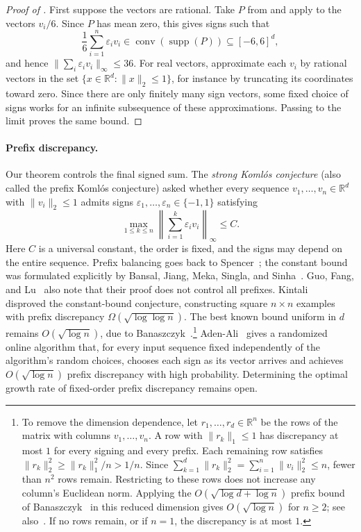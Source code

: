\documentclass{article}
\newcommand{\R}{\mathbb{R}}
\newcommand{\eps}{\varepsilon}
\newcommand{\supp}{\operatorname{supp}}
\newcommand{\norm}[1]{\left \| #1 \right \|}
\begin{document}
\begin{proof}[Proof of ]
First suppose the vectors are rational. Take $P$ from
 and apply  to the vectors
$v_i/6$. Since $P$ has mean zero, this gives signs such that
\[
\frac16\sum_{i=1}^n\eps_i v_i
\in\operatorname{conv}(\supp(P))\subseteq[-6,6]^d,
\]
and hence $\|\sum_i\eps_i v_i\|_\infty\le36$.
For real vectors, approximate each $v_i$ by rational vectors in the
set $\{x\in\R^d:\|x\|_2\le1\}$, for instance by truncating its coordinates
toward zero. Since there are only finitely many sign vectors, some
fixed choice of signs works for an infinite subsequence of these approximations.
Passing to the limit proves the same bound.
\end{proof}

\paragraph{Prefix discrepancy.}
Our theorem controls the final signed sum.
The \emph{strong Koml\'os conjecture} (also called the prefix
Koml\'os conjecture) asked whether every sequence
$v_1,\ldots,v_n\in\R^d$ with $\|v_i\|_2\le1$ admits signs
$\eps_1,\ldots,\eps_n\in\{-1,1\}$ satisfying
\[
\max_{1\le k\le n}
\norm{\sum_{i=1}^k\eps_i v_i}_{\infty}\le C.
\]
Here $C$ is a universal constant, the order is fixed, and the
signs may depend on the entire sequence.
Prefix balancing goes back to Spencer~\cite{spencer1977balancing};
the constant bound was formulated explicitly by Bansal, Jiang,
Meka, Singla, and Sinha~\cite[Open Problem~6.1 in the full version]{bansal2022prefix}.
Guo, Fang, and Lu~\cite[Section~1.2]{guo2026vector} also note that
their proof does not control all prefixes.
Kintali~\cite{kintali2026strong} disproved the constant-bound
conjecture, constructing square $n\times n$ examples with prefix
discrepancy $\Omega(\sqrt{\log\log n})$.
The best known bound uniform in $d$ remains $O(\sqrt{\log n})$,
due to Banaszczyk~\cite{banaszczyk2012series}.\footnote{
To remove the dimension dependence, let $r_1,\ldots,r_d\in\R^n$
be the rows of the matrix with columns $v_1,\ldots,v_n$.
A row with $\|r_k\|_1\le1$ has discrepancy at most $1$ for every
signing and every prefix. Each remaining row satisfies
$\|r_k\|_2^2\ge\|r_k\|_1^2/n>1/n$.
Since
$\sum_{k=1}^d\|r_k\|_2^2=\sum_{i=1}^n\|v_i\|_2^2\le n$,
fewer than $n^2$ rows remain.
Restricting to these rows does not increase any column's Euclidean
norm. Applying the $O(\sqrt{\log d+\log n})$ prefix bound of Banaszczyk~\cite{banaszczyk2012series}
in this reduced dimension gives $O(\sqrt{\log n})$ for $n\ge2$;
see also~\cite[Theorem~1.1]{bansal2022prefix}.
If no rows remain, or if $n=1$, the discrepancy is at most $1$.
}
Aden-Ali~\cite{aden2026optimal} gives a randomized online algorithm
that, for every input sequence fixed independently of the algorithm's
random choices, chooses each sign as its vector arrives and achieves
$O(\sqrt{\log n})$ prefix discrepancy with high probability.
Determining the optimal growth rate of fixed-order prefix
discrepancy remains open.
\end{document}
